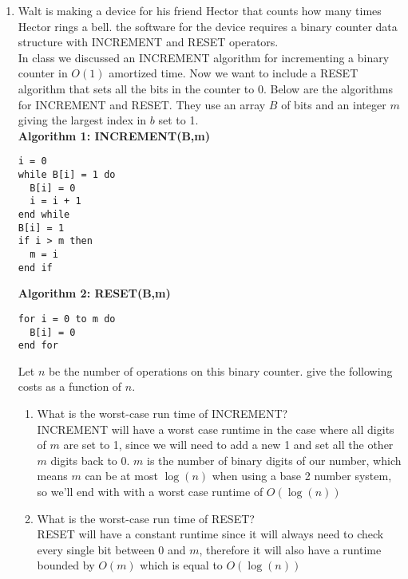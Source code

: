 \documentclass{article}
\begin{document}
\begin{enumerate}
\item Walt is making a device for his friend Hector that counts how many times Hector rings a bell. the software for the device requires a binary counter data structure with INCREMENT and RESET operators. \\
In class we discussed an INCREMENT algorithm for incrementing a binary counter in $O(1)$ amortized time. Now we want to include a RESET algorithm that sets all the bits in the counter to 0. Below are the algorithms for INCREMENT and RESET. They use an array $B$ of bits and an integer $m$ giving the largest index in $b$ set to 1. \\
\newline 
\textbf{Algorithm 1: INCREMENT(B,m)}
\begin{verbatim}
i = 0 
while B[i] = 1 do 
  B[i] = 0 
  i = i + 1 
end while 
B[i] = 1 
if i > m then 
  m = i 
end if
\end{verbatim}
\textbf{Algorithm 2: RESET(B,m)}
\begin{verbatim}
for i = 0 to m do 
  B[i] = 0
end for
\end{verbatim}
Let $n$ be the number of operations on this binary counter. give the following costs as a function of $n$. 




\begin{enumerate}
\item What is the worst-case run time of INCREMENT? \\

INCREMENT will have a worst case runtime in the case where all digits of $m$ are set to 1, since we will need to add a new 1 and set all the other $m$ digits back to 0. $m$ is the number of binary digits of our number, which means $m$ can be at most $\log(n)$ when using a base 2 number system, so we'll end with with a worst case runtime of $O(\log(n))$ \\





\item What is the worst-case run time of RESET? \\

RESET will have a constant runtime since it will always need to check every single bit between 0 and $m$, therefore it will also have a runtime bounded by $O(m)$ which is equal to $O(\log(n))$ \\






\end{enumerate}
\end{enumerate}
\end{document}
